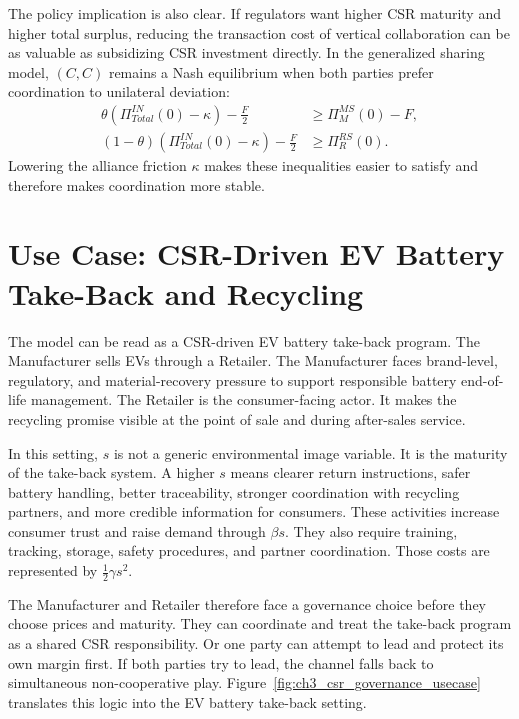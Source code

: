The policy implication is also clear. If regulators want higher CSR maturity and higher total surplus, reducing the transaction cost of vertical collaboration can be as valuable as subsidizing CSR investment directly. In the generalized sharing model, $(C,C)$ remains a Nash equilibrium when both parties prefer coordination to unilateral deviation:
\begin{align*}
    \theta\left(\Pi_{Total}^{IN}(0)-\kappa\right)-\frac{F}{2}
    &\geq \Pi_M^{MS}(0)-F,\\
    (1-\theta)\left(\Pi_{Total}^{IN}(0)-\kappa\right)-\frac{F}{2}
    &\geq \Pi_R^{RS}(0).
\end{align*}
Lowering the alliance friction $\kappa$ makes these inequalities easier to satisfy and therefore makes coordination more stable.

\section{Use Case: CSR-Driven EV Battery Take-Back and Recycling}
\label{sec:ch3_csr_usecase}

The model can be read as a CSR-driven EV battery take-back program. The Manufacturer sells EVs through a Retailer. The Manufacturer faces brand-level, regulatory, and material-recovery pressure to support responsible battery end-of-life management. The Retailer is the consumer-facing actor. It makes the recycling promise visible at the point of sale and during after-sales service.

In this setting, $s$ is not a generic environmental image variable. It is the maturity of the take-back system. A higher $s$ means clearer return instructions, safer battery handling, better traceability, stronger coordination with recycling partners, and more credible information for consumers. These activities increase consumer trust and raise demand through $\beta s$. They also require training, tracking, storage, safety procedures, and partner coordination. Those costs are represented by $\frac12\gamma s^2$.

The Manufacturer and Retailer therefore face a governance choice before they choose prices and maturity. They can coordinate and treat the take-back program as a shared CSR responsibility. Or one party can attempt to lead and protect its own margin first. If both parties try to lead, the channel falls back to simultaneous non-cooperative play. Figure~\ref{fig:ch3_csr_governance_usecase} translates this logic into the EV battery take-back setting.

